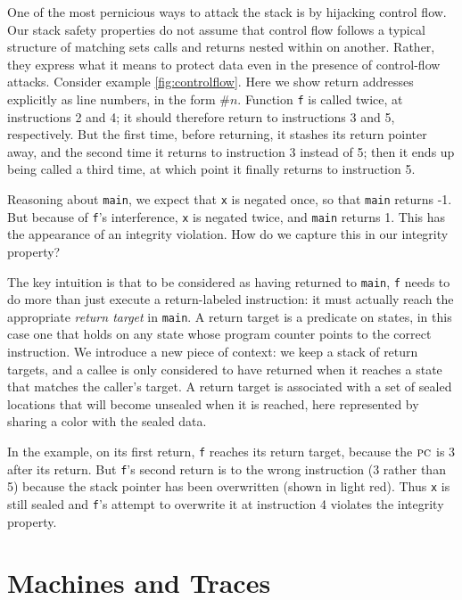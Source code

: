 \documentclass[acmsmall,review,anonymous]{acmart}\settopmatter{printfolios=true,printccs=false,printacmref=false}
\begin{document}
One of the most pernicious ways to attack the stack is by hijacking control flow.
Our stack safety properties do not assume that control flow follows a typical structure
of matching sets calls and returns nested within on another.
Rather, they express what it means to protect data even in the presence of control-flow attacks.
Consider example \ref{fig:controlflow}.
Here we show return addresses explicitly as line numbers, in the form $\#n$.
Function {\tt f} is called twice, at instructions 2 and 4; it should therefore return to instructions
3 and 5, respectively. But the first time, before returning, it stashes its
return pointer away, and the second time it returns to instruction 3 instead of 5; then it ends
up being called a third time, at which point it finally returns to instruction 5.

Reasoning about {\tt main}, we expect that {\tt x} is negated once, so that {\tt main} returns
-1. But because of {\tt f}'s interference, {\tt x} is negated twice, and {\tt main} returns 1.
This has the appearance of an integrity violation.  How do we capture this in our
integrity property?

The key intuition is that to be considered as having returned to {\tt main}, {\tt f} needs
to do more than just execute a return-labeled instruction: it must actually reach the
appropriate {\em return target} in {\tt main}. A return target is a predicate on states,
in this case one that holds on any state whose program counter points to the correct instruction.
We introduce a new piece of context: we keep a stack of return targets, and a callee is
only considered to have returned when it reaches a state that matches the caller's target.
A return target is associated with a set of sealed locations that will become unsealed
when it is reached, here represented by sharing a color with the sealed data.

In the example, on its first return, {\tt f} reaches its return target, because the
\(\textsc{pc}\) is 3 after its return. But {\tt f}'s second return is to the wrong instruction
(3 rather than 5) because the stack pointer has been overwritten (shown in light red).
Thus {\tt x} is still sealed and {\tt f}'s attempt to overwrite it at instruction 4
violates the integrity property.

\section{Machines and Traces}
\label{sec:prelim}
\end{document}

